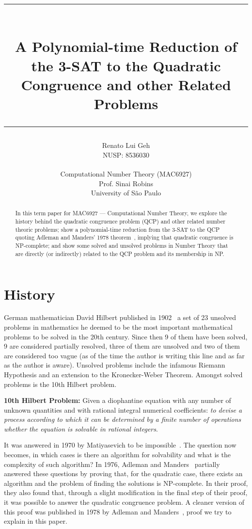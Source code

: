 \documentclass{amsart}
\title{%
  \noindent\rule{13cm}{1.0pt}\\
  \vspace{0.2cm}
  A Polynomial-time Reduction of the 3-SAT to the Quadratic Congruence and other Related Problems
  \noindent\rule{13cm}{0.8pt}
}
\author[]{\normalsize Renato Lui Geh\\\small NUSP\@: 8536030\\\\Computational Number Theory
(MAC6927)\\Prof\@. Sinai Robins\\University of São Paulo\\}
\theoremstyle{plain}
\begin{document}
\begin{abstract}
  In this term paper for MAC6927 --- Computational Number Theory, we explore the history behind the
  quadratic congruence problem (QCP) and other related number theoric problems; show a
  polynomial-time reduction from the 3-SAT to the QCP quoting Adleman and Manders' 1978
  theorem~\cite{qcp2}, implying that quadratic congruence is NP-complete; and show some solved and
  unsolved problems in Number Theory that are directly (or indirectly) related to the QCP problem
  and its membership in NP\@.
  \vspace*{-3.5em}
\end{abstract}

\maketitle

\section{History}

German mathematician David Hilbert published in 1902~\cite{hilbert} a set of 23 unsolved problems
in mathematics he deemed to be the most important mathematical problems to be solved in the 20th
century. Since then 9 of them have been solved, 9 are considered partially resolved, three of them
are unsolved and two of them are considered too vague (as of the time the author is writing this
line and as far as the author is aware). Unsolved problems include the infamous Riemann Hypothesis
and an extension to the Kronecker-Weber Theorem. Amongst solved problems is the 10th Hilbert
problem.

\textbf{10th Hilbert Problem:} Given a diophantine equation with any number of unknown quantities
and with rational integral numerical coefficients: \textit{to devise a process according to which
it can be determined by a finite number of operations whether the equation is solvable in rational
integers}.

It was answered in 1970 by Matiyasevich to be impossible~\cite{diophantine}. The question now
becomes, in which cases is there an algorithm for solvability and what is the complexity of such
algorithm? In 1976, Adleman and Manders~\cite{qcp1} partially answered these questions by proving
that, for the quadratic case, there exists an algorithm and the problem of finding the solutions is
NP-complete. In their proof, they also found that, through a slight modification in the final step
of their proof, it was possible to answer the quadratic congruence problem. A cleaner version of
this proof was published in 1978 by Adleman and Manders~\cite{qcp2}, proof we try to explain in
this paper.
\end{document}
